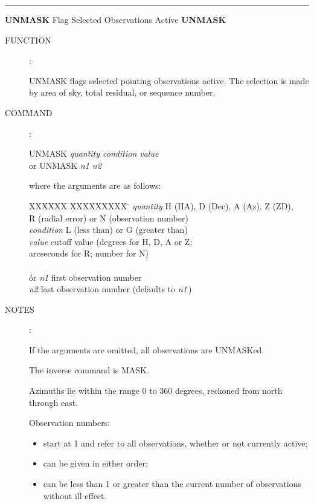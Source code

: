 \goodbreak
\rule{\textwidth}{0.3mm}
{\Large {\bf UNMASK} \hfill Flag Selected Observations Active \hfill
                                                         {\bf UNMASK}}
\begin{description}
\item [FUNCTION]:

UNMASK flags selected pointing observations active.  The selection
is made by area of sky, total residual, or sequence number.

\item [COMMAND]:

\begin{cmd}
\> \> UNMASK {\it quantity  condition  value } \\
\> or \> UNMASK {\it n1  n2 }
\end{cmd}

where the arguments are as follows:
\begin{tabbing}
XXXXXX \= XXXXXXXXX \= \kill
\> {\it quantity}  \> H (HA), D (Dec), A (Az), Z (ZD), \\
\>                 \> R (radial error) or N (observation number) \\
\> {\it condition} \> L (less than) or G (greater than) \\
\> {\it value}     \> cutoff value (degrees for H, D, A or Z; \\
\>                 \> arcseconds for R; number for N) \\ \\
\' or \> {\it n1}  \> first observation number \\
      \> {\it n2}  \> last observation number (defaults to {\it n1}\,)
\end{tabbing}

\item [NOTES]:

If the arguments are omitted, all observations are UNMASKed.

The inverse command is MASK.

Azimuths lie within the range 0 to 360 degrees, reckoned
from north through east.

\goodbreak
Observation numbers:
\begin{itemize}
\item start at 1 and refer to all observations, whether or not
      currently active;
\item can be given in either order;
\item can be less than 1 or greater than the current number of
      observations without ill effect.
\end{itemize}


\end{description}
